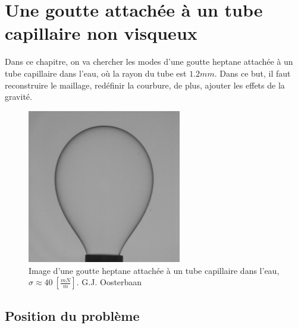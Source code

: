 \documentclass[a4paper]{report}
\begin{document}
\chapter{Une goutte attachée à un tube capillaire non visqueux}
Dans ce chapitre, on va chercher les modes d'une goutte heptane attachée à un tube capillaire dans l'eau, où la rayon du tube est $1.2mm$. Dans ce but, il faut reconstruire le maillage, redéfinir la courbure, de plus, ajouter les effets de la gravité.
\begin{figure}[!htbp]
\begin{center}
\includegraphics[width=0.6\textwidth, bb = 0 0 1024 1024]{HeptaneWaterApproxGamma_45.jpg}
\caption{Image d'une goutte heptane attachée à un tube capillaire dans l'eau, $\sigma\approx40\ [\frac{mN}{m}]$. G.J. Oosterbaan \cite{6}}
\end{center}
\end{figure}
\newpage
\section{Position du problème}
\end{document}
